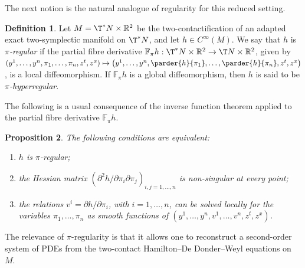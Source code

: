 \documentclass[11pt,a4paper]{article}
\theoremstyle{plain} \newtheorem{theorem}{Theorem}[section] \newtheorem{proposition}[theorem]{Proposition} \newtheorem{corollary}[theorem]{Corollary} \newtheorem{lemma}[theorem]{Lemma} \theoremstyle{definition} \newtheorem{definition}[theorem]{Definition} \theoremstyle{remark} \newtheorem{remark}[theorem]{Remark} \newtheorem{example}[theorem]{Example} %
\begin{document}
The next notion is the natural analogue of regularity for this reduced setting.

\begin{definition}\label{def:xregular_reduced}
Let \(M=\T^*N\times\mathbb R^2\) be the two-contactification of an adapted exact two-symplectic manifold on $\T^*N$, and let \(h\in C^\infty(M)\). We say that \(h\) is {\it \(\pi\)-regular} if the partial fibre derivative \(\mathbb F_\pi h:\T^*N\times\mathbb R^2\to \T N\times\mathbb R^2\), given by \((y^1,\dots,y^n,\pi_1,\dots,\pi_n,z^t,z^x)\mapsto \left(y^1,\dots,y^n,\parder{h}{\pi_1},\dots,\parder{h}{\pi_n},z^t,z^x\right)\), is a local diffeomorphism. If \(\mathbb F_\pi h\) is a global diffeomorphism, then \(h\) is said to be {\it \(\pi\)-hyperregular}.
\end{definition}

The following is a usual consequence of the inverse function theorem applied to the partial fibre derivative \(\mathbb F_\pi h\).

\begin{proposition}\label{prop:xregular_equivalent}
The following conditions are equivalent:
\begin{enumerate}
\item \(h\) is \(\pi\)-regular;
\item the Hessian matrix \(\left(\partial^2 h/\partial \pi_i\partial \pi_j\right)_{i,j=1,\dots,n}\) is non-singular at every point;
\item the relations \(v^i=\partial h/\partial \pi_i\), with \(i=1,\dots,n\), can be solved locally for the variables \(\pi_1,\dots,\pi_n\) as smooth functions of \((y^1,\dots,y^n,v^1,\dots,v^n,z^t,z^x)\).
\end{enumerate}
\end{proposition}

The relevance of $\pi$-regularity is that it allows one to reconstruct a second-order system of PDEs from the two-contact Hamilton–De Donder–Weyl equations on $M$.
\end{document}
